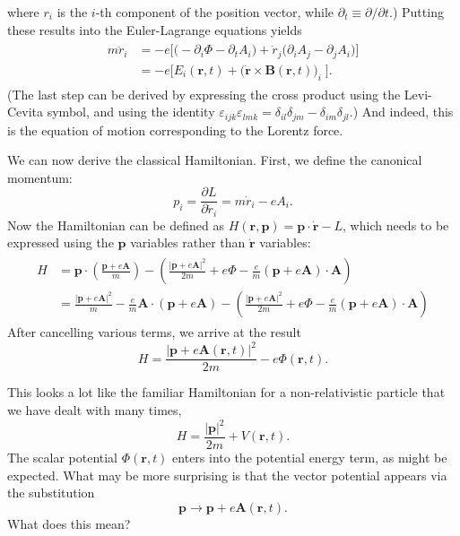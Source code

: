 \documentclass[pra,12pt]{revtex4}
\begin{document}
where $r_i$ is the $i$-th component of the position vector, while
$\partial_t \equiv \partial/\partial t$.)  Putting these results into
the Euler-Lagrange equations yields
\begin{align}
  \begin{aligned}
    m\ddot{r}_i &=
    -e\Big[\Big(-\partial_i \Phi - \partial_t A_i\Big)
      + \dot{r}_j \Big( \partial_i A_j - \partial_j A_i\Big) \Big] \\
    &= -e \Big[E_i(\mathbf{r},t) + \big(\dot{\mathbf{r}} \times
      \mathbf{B}(\mathbf{r},t) \big)_i\; \Big].
  \end{aligned}
\end{align}
(The last step can be derived by expressing the cross product using
the Levi-Cevita symbol, and using the identity $\varepsilon_{ijk}
\varepsilon_{lmk} = \delta_{il} \delta_{jm} - \delta_{im}
\delta_{jl}$.)  And indeed, this is the equation of motion
corresponding to the Lorentz force.

We can now derive the classical Hamiltonian.  First, we define the
canonical momentum:
\begin{equation}
  p_i = \frac{\partial L}{\partial \dot{r}_i} = m\dot{r}_i - e A_i.
\end{equation}
Now the Hamiltonian can be defined as $H(\mathbf{r},\mathbf{p}) =
\mathbf{p} \cdot \dot{\mathbf{r}} - L$, which needs to be expressed
using the $\mathbf{p}$ variables rather than $\dot{\mathbf{r}}$
variables:
\begin{align}
  \begin{aligned}
    H &= \mathbf{p}\cdot \left(\frac{\mathbf{p}+e\mathbf{A}}{m}\right)
    - \left(\frac{|\mathbf{p}+e\mathbf{A}|^2}{2m}
    + e\Phi - \frac{e}{m}(\mathbf{p}+e\mathbf{A})\cdot \mathbf{A}\right) \\
    &= \frac{|\mathbf{p}+e\mathbf{A}|^2}{m}
    - \frac{e}{m}\mathbf{A}\cdot \left(\mathbf{p}+e\mathbf{A}\right)
    - \left(\frac{|\mathbf{p}+e\mathbf{A}|^2}{2m}
    + e\Phi - \frac{e}{m}(\mathbf{p}+e\mathbf{A})\cdot \mathbf{A}\right)
  \end{aligned}
\end{align}
After cancelling various terms, we arrive at the result
\begin{equation}
H = \frac{|\mathbf{p}+e\mathbf{A}(\mathbf{r},t)|^2}{2m} - e\Phi(\mathbf{r},t).
\end{equation}

This looks a lot like the familiar Hamiltonian for a non-relativistic
particle that we have dealt with many times,
\begin{equation}
  H = \frac{|\mathbf{p}|^2}{2m} + V(\mathbf{r},t).
\end{equation}
The scalar potential $\Phi(\mathbf{r},t)$ enters into the potential
energy term, as might be expected.  What may be more surprising is
that the vector potential appears via the substitution
\begin{equation}
  \mathbf{p} \rightarrow \mathbf{p} + e\mathbf{A}(\mathbf{r},t).  
\end{equation}
What does this mean?
\end{document}
